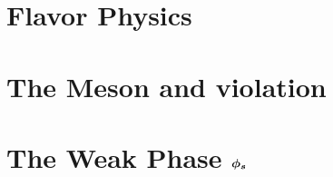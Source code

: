 \section{Flavor Physics}
\label{Flavor_Physics}


\section{The \Bs Meson and \CP violation}
\label{Phenomenology}


\section{The Weak Phase $\boldsymbol{\phi_{s}}$}
\label{WeakPhase}


